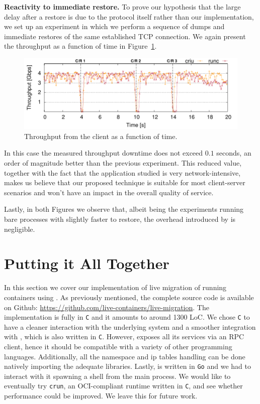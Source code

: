 \textbf{Reactivity to immediate restore.}
To prove our hypothesis that the large delay after a restore is due to the protocol itself rather than our implementation, we set up an experiment in which we perform a sequence of dumps and immediate restores of the same established TCP connection.
We again present the throughput as a function of time in Figure~\ref{fig:evaluation-reactivity}.
\begin{figure}[h!]
    \centering
    \includegraphics[width=\linewidth]{./figs/tcp-established-resolution/tcp_established_resolution_microbenchmark.pdf}
    \caption{Throughput from the client as a function of time.\label{fig:evaluation-reactivity}}
\end{figure}
In this case the measured throughput downtime does not exceed $0.1$ seconds, an order of magnitude better than the previous experiment.
This reduced value, together with the fact that the application studied is very network-intensive, makes us believe that our proposed technique is suitable for most client-server scenarios and won't have an impact in the overall quality of service.

Lastly, in both Figures we observe that, albeit being the experiments running bare processes with \criu slightly faster to restore, the overhead introduced by \runc is negligible.

\section{Putting it All Together} \label{sec:system}

In this section we cover our implementation of live migration of running \runc containers using \criu.
As previously mentioned, the complete source code is available on Github: \url{https://github.com/live-containers/live-migration}.
The implementation is fully in \texttt{C} and it amounts to around 1300 LoC.
We chose \texttt{C} to have a cleaner interaction with the underlying system and a smoother integration with \criu, which is also written in \texttt{C}.
However, \criu exposes all its services via an RPC client, hence it should be compatible with a variety of other programming languages.
Additionally, all the namespace and ip tables handling can be done natively importing the adequate libraries.
Lastly, \runc is written in \texttt{Go} and we had to interact with it spawning a shell from the main process.
We would like to eventually try \texttt{crun}, an OCI-compliant runtime written in \texttt{C}, and see whether performance could be improved.
We leave this for future work.

